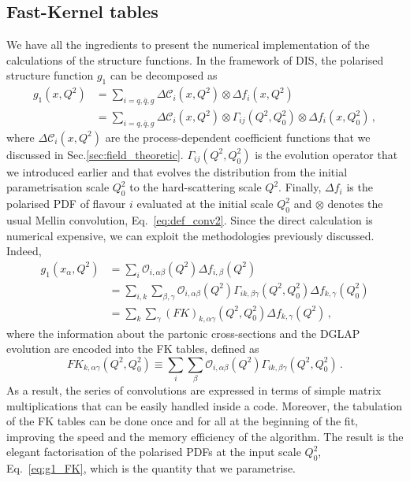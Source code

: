 \subsection*{Fast-Kernel tables}
We have all the ingredients to present the numerical implementation of the calculations of the structure functions. In the framework of DIS, the polarised structure function $g_1$ can be decomposed as 
\begin{equation}
  \begin{split}
    g_1(x,Q^2) & = \sum_{i=q,\bar{q},g} \Delta \mathcal{C}_{i}(x,Q^2) \otimes \Delta f_i (x,Q^2) \\
    & = \sum_{i=q,\bar{q},g} \Delta \mathcal{C}_{i}(x,Q^2) \otimes \Gamma_{ij} (Q^2,Q^2_0) \otimes \Delta f_i (x,Q^2_0) \,,
  \end{split}
\end{equation}
where $\Delta \mathcal{C}_{i}(x,Q^2)$ are the process-dependent coefficient functions that we discussed in Sec.\ref{sec:field_theoretic}. $\Gamma_{ij} (Q^2,Q^2_0)$ is the evolution operator that we introduced earlier and that evolves the distribution from the initial parametrisation scale $Q^2_0$ to the hard-scattering scale $Q^2$. Finally, $\Delta f_i$ is the polarised PDF of flavour $i$ evaluated at the initial scale $Q^2_0$ and $\otimes$ denotes the usual Mellin convolution, Eq.~\eqref{eq:def_conv2}. Since the direct calculation is numerical expensive, we can exploit the methodologies previously discussed. Indeed, 
\begin{equation}
  \begin{split}
    g_1 (x_{\alpha},Q^2) & = \sum_{i} \mathcal{O}_{i,\alpha \beta}(Q^2) \Delta f_{i,\beta}(Q^2) \\
    & = \sum_{i,k} \sum_{\beta, \gamma} \mathcal{O}_{i,\alpha \beta}(Q^2) \Gamma_{ik,\beta \gamma} (Q^2,Q^2_0) \Delta f_{k,\gamma}(Q^2_0) \\
    & = \sum_{k} \sum_{\gamma} \left( FK \right)_{k, \alpha \gamma} (Q^2,Q^2_0) \Delta f_{k, \gamma}(Q^2) \,,
    \label{eq:g1_FK}
  \end{split}
\end{equation}
where the information about the partonic cross-sections and the DGLAP evolution are encoded into the FK tables, defined as
\begin{equation}
  FK_{k, \alpha \gamma}  (Q^2, Q^2_0) \equiv \sum_i \sum_{\beta} \mathcal{O}_{i,\alpha \beta}(Q^2) \Gamma_{ik,\beta \gamma} (Q^2, Q^2_0)\,.
\end{equation}
As a result, the series of convolutions are expressed in terms of simple matrix multiplications that can be easily handled inside a code. Moreover, the tabulation of the FK tables can be done once and for all at the beginning of the fit, improving the speed and the memory efficiency of the algorithm. The result is the elegant factorisation of the polarised PDFs at the input scale $Q^2_0$, Eq.~\eqref{eq:g1_FK}, which is the quantity that we parametrise.\par
